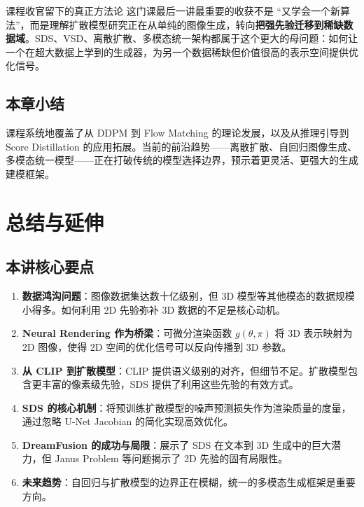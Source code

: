 \documentclass[a4paper]{article}
\begin{document}
\begin{importantbox}{课程收官留下的真正方法论}
这门课最后一讲最重要的收获不是 ``又学会一个新算法''，而是理解扩散模型研究正在从单纯的图像生成，转向\textbf{把强先验迁移到稀缺数据域}。SDS、VSD、离散扩散、多模态统一架构都属于这个更大的母问题：如何让一个在超大数据上学到的生成器，为另一个数据稀缺但价值很高的表示空间提供优化信号。
\end{importantbox}

\subsection{本章小结}

课程系统地覆盖了从 DDPM 到 Flow Matching 的理论发展，以及从推理引导到 Score Distillation 的应用拓展。当前的前沿趋势——离散扩散、自回归图像生成、多模态统一模型——正在打破传统的模型选择边界，预示着更灵活、更强大的生成建模框架。

\newpage
\section{总结与延伸}

\subsection{本讲核心要点}

\begin{enumerate}
    \item \textbf{数据鸿沟问题}：图像数据集达数十亿级别，但 3D 模型等其他模态的数据规模小得多。如何利用 2D 先验弥补 3D 数据的不足是核心动机。

    \item \textbf{Neural Rendering 作为桥梁}：可微分渲染函数 $g(\theta, \pi)$ 将 3D 表示映射为 2D 图像，使得 2D 空间的优化信号可以反向传播到 3D 参数。

    \item \textbf{从 CLIP 到扩散模型}：CLIP 提供语义级别的对齐，但细节不足。扩散模型包含更丰富的像素级先验，SDS 提供了利用这些先验的有效方式。

    \item \textbf{SDS 的核心机制}：将预训练扩散模型的噪声预测损失作为渲染质量的度量，通过忽略 U-Net Jacobian 的简化实现高效优化。

    \item \textbf{DreamFusion 的成功与局限}：展示了 SDS 在文本到 3D 生成中的巨大潜力，但 Janus Problem 等问题揭示了 2D 先验的固有局限性。

    \item \textbf{未来趋势}：自回归与扩散模型的边界正在模糊，统一的多模态生成框架是重要方向。
\end{enumerate}
\end{document}
